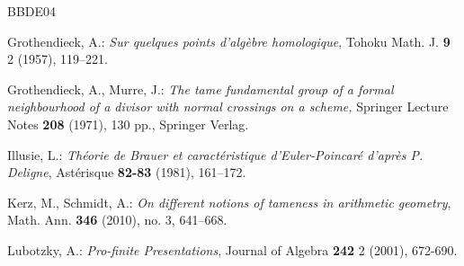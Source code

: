 \documentclass[12pt]{amsart}
\theoremstyle{plain}
\theoremstyle{definition}
\numberwithin{thm}{section}
\numberwithin{equation}{section}
\begin{document}
\begin{thebibliography}{BBDE04}

 Grothendieck, A.: {\it Sur quelques points d'alg\`ebre homologique},  Tohoku Math. J. {\bf 9} 2 (1957), 119--221.

 Grothendieck, A., Murre, J.: {\it The tame fundamental group of a formal neighbourhood of a divisor with normal crossings on a scheme, } Springer Lecture Notes {\bf 208} (1971), 130 pp., Springer Verlag.



 Illusie, L.: {\it Th\'eorie de Brauer et caract\'eristique d'Euler-Poincar\'e d'apr\`es P. Deligne}, Ast\'erisque {\bf 82-83} (1981), 161--172.


 Kerz, M., Schmidt, A.: {\it On different notions of tameness in arithmetic geometry},  Math. Ann. {\bf 346} (2010), no. 3, 641--668.

  Lubotzky, A.: \emph{Pro-finite Presentations}, Journal of Algebra {\bf 242}  2 (2001), 672-690.


\end{thebibliography}
\end{document}
